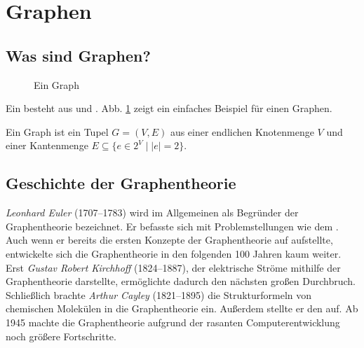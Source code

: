 \section{Graphen}

\subsection{Was sind Graphen?}
\begin{figure}
\centering
	\caption{Ein Graph}
	\label{einfuehrungsgraph}
\end{figure}

Ein  besteht aus  und .  
Abb. \ref{einfuehrungsgraph} zeigt ein einfaches Beispiel für einen Graphen.


\begin{df}
Ein Graph ist ein Tupel $G = (V,E)$ aus einer endlichen Knotenmenge $V$ und einer Kantenmenge $E \subseteq \{e \in 2^{V}\mid |e| = 2\}$.
\end{df}

\subsection{Geschichte der Graphentheorie}
\textit{Leonhard Euler} (1707--1783) wird im Allgemeinen als Begründer der Graphentheorie bezeichnet. Er befasste sich mit Problemstellungen wie dem .
Auch wenn er bereits die ersten Konzepte der Graphentheorie auf aufstellte, entwickelte sich die Graphentheorie in den folgenden 100 Jahren kaum weiter. 
Erst \textit{Gustav Robert Kirchhoff} (1824--1887), der elektrische Ströme mithilfe der Graphentheorie darstellte, ermöglichte dadurch den nächsten großen Durchbruch.
Schließlich brachte \textit{Arthur Cayley} (1821--1895)  die Strukturformeln von chemischen Molekülen in die Graphentheorie ein. Außerdem stellte er den  auf.
Ab 1945 machte die Graphentheorie aufgrund der rasanten Computerentwicklung noch größere Fortschritte.

